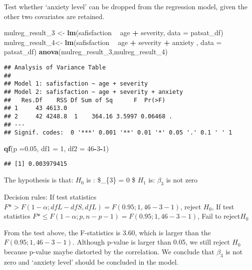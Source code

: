 \documentclass[]{article}
\newenvironment{Shaded}{\begin{snugshade}}{\end{snugshade}}
\newcommand{\KeywordTok}[1]{\textcolor[rgb]{0.13,0.29,0.53}{\textbf{#1}}}
\newcommand{\DataTypeTok}[1]{\textcolor[rgb]{0.13,0.29,0.53}{#1}}
\newcommand{\DecValTok}[1]{\textcolor[rgb]{0.00,0.00,0.81}{#1}}
\newcommand{\FloatTok}[1]{\textcolor[rgb]{0.00,0.00,0.81}{#1}}
\newcommand{\StringTok}[1]{\textcolor[rgb]{0.31,0.60,0.02}{#1}}
\newcommand{\OperatorTok}[1]{\textcolor[rgb]{0.81,0.36,0.00}{\textbf{#1}}}
\newcommand{\NormalTok}[1]{#1}
\begin{document}
Test whether `anxiety level' can be dropped from the regression model,
given the other two covariates are retained.

\begin{Shaded}
\begin{Highlighting}[]
\NormalTok{mulreg_result_}\DecValTok{3}\NormalTok{ <-}\StringTok{ }\KeywordTok{lm}\NormalTok{(safisfaction }\OperatorTok{~}\StringTok{ }\NormalTok{age }\OperatorTok{+}\StringTok{ }\NormalTok{severity, }\DataTypeTok{data =}\NormalTok{ patsat_df)}
\NormalTok{mulreg_result_}\DecValTok{4}\NormalTok{<-}\StringTok{ }\KeywordTok{lm}\NormalTok{(safisfaction }\OperatorTok{~}\StringTok{ }\NormalTok{age }\OperatorTok{+}\StringTok{ }\NormalTok{severity }\OperatorTok{+}\StringTok{ }\NormalTok{anxiety , }\DataTypeTok{data =}\NormalTok{ patsat_df)}
\KeywordTok{anova}\NormalTok{(mulreg_result_}\DecValTok{3}\NormalTok{,mulreg_result_}\DecValTok{4}\NormalTok{)}
\end{Highlighting}
\end{Shaded}

\begin{verbatim}
## Analysis of Variance Table
## 
## Model 1: safisfaction ~ age + severity
## Model 2: safisfaction ~ age + severity + anxiety
##   Res.Df    RSS Df Sum of Sq      F  Pr(>F)  
## 1     43 4613.0                              
## 2     42 4248.8  1    364.16 3.5997 0.06468 .
## ---
## Signif. codes:  0 '***' 0.001 '**' 0.01 '*' 0.05 '.' 0.1 ' ' 1
\end{verbatim}

\begin{Shaded}
\begin{Highlighting}[]
\KeywordTok{qf}\NormalTok{(}\DataTypeTok{p =}\FloatTok{0.05}\NormalTok{, }\DataTypeTok{df1 =} \DecValTok{1}\NormalTok{, }\DataTypeTok{df2 =} \DecValTok{46}\OperatorTok{-}\DecValTok{3}\OperatorTok{-}\DecValTok{1}\NormalTok{)}
\end{Highlighting}
\end{Shaded}

\begin{verbatim}
## [1] 0.003979415
\end{verbatim}

The hypothesis is that: \(H_{0}\) is : \$\beta\_\{3\} = 0 \$ \(H_{1}\)
is: \(\beta_3\) is not zero

Decision rules: If test statistics
\(F* > F(1-\alpha;dfL-dfS,dfL) = F(0.95;1,46-3-1)\), reject \(H_{0}\),
If test statistics
\(F* \leqslant F(1-\alpha;p,n-p-1) = F(0.95;1,46-3-1)\), Fail to
reject\(H_{0}\)

From the test above, the F-statistics is 3.60, which is larger than the
\(F(0.95;1,46-3-1)\). Although p-value is larger than 0.05, we still
reject \(H_{0}\) because p-value maybe distorted by the correlation. We
conclude that \(\beta_3\) is not zero and `anxiety level' should be
concluded in the model.
\end{document}
